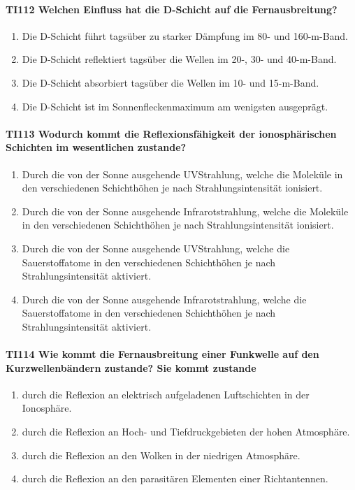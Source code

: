 \documentclass[8pt]{article}
\begin{document}
\paragraph*{TI112 Welchen Einfluss hat die D-Schicht auf die Fernausbreitung?}
\begin{enumerate}[nolistsep,label=\Alph*]
\item Die D-Schicht führt tagsüber zu starker Dämpfung im 80- und 160-m-Band.
\item Die D-Schicht reflektiert tagsüber die Wellen im 20-, 30- und 40-m-Band.
\item Die D-Schicht absorbiert tagsüber die Wellen im 10- und 15-m-Band.
\item Die D-Schicht ist im Sonnenfleckenmaximum am wenigsten ausgeprägt.
\end{enumerate}

\paragraph*{TI113 Wodurch kommt die Reflexionsfähigkeit der ionosphärischen Schichten im wesentlichen zustande?}
\begin{enumerate}[nolistsep,label=\Alph*]
\item Durch die von der Sonne ausgehende UVStrahlung, welche die Moleküle in den verschiedenen Schichthöhen je nach Strahlungsintensität ionisiert.
\item Durch die von der Sonne ausgehende Infrarotstrahlung, welche die Moleküle in den verschiedenen Schichthöhen je nach Strahlungsintensität ionisiert.
\item Durch die von der Sonne ausgehende UVStrahlung, welche die Sauerstoffatome in den verschiedenen Schichthöhen je nach Strahlungsintensität aktiviert.
\item Durch die von der Sonne ausgehende Infrarotstrahlung, welche die Sauerstoffatome in den verschiedenen Schichthöhen je nach Strahlungsintensität aktiviert.
\end{enumerate}

\paragraph*{TI114 Wie kommt die Fernausbreitung einer Funkwelle auf den Kurzwellenbändern zustande? Sie kommt zustande}
\begin{enumerate}[nolistsep,label=\Alph*]
\item durch die Reflexion an elektrisch aufgeladenen Luftschichten in der Ionosphäre.
\item durch die Reflexion an Hoch- und Tiefdruckgebieten der hohen Atmosphäre.
\item durch die Reflexion an den Wolken in der niedrigen Atmosphäre.
\item durch die Reflexion an den parasitären Elementen einer Richtantennen.
\end{enumerate}
\end{document}
